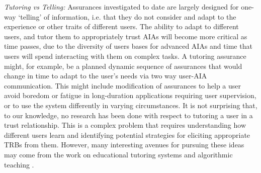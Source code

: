 \emph{Tutoring vs Telling:}
Assurances investigated to date are largely designed for one-way `telling' of information, i.e. that they do not consider and adapt to the experience or other traits of different users. The ability to adapt to different users, and tutor them to appropriately trust AIAs will become more critical as time passes, due to the diversity of users bases for advanced AIAs and time that users will spend interacting with them on complex tasks. A tutoring assurance might, for example, be a planned dynamic sequence of assurances that would change in time to adapt to the user's needs via two way user-AIA communication. This might include modification of assurances to help a user avoid boredom or fatigue in long-duration applications requiring user supervision, or to use the system differently in varying circumstances. It is not surprising that, to our knowledge, no research has been done with respect to tutoring a user in a trust relationship. This is a complex problem that requires understanding how different users learn and identifying potential strategies for eliciting appropriate TRBs from them. However, many interesting avenues for pursuing these ideas 
may come from the work on educational tutoring systems \cite{Wenger2014-ld} and algorithmic teaching  \cite{Balbach2009-jw}.
